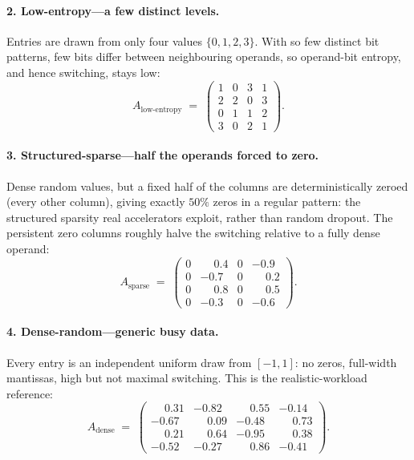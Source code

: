 \documentclass{article}
\theoremstyle{plain}
\theoremstyle{definition}
\theoremstyle{remark}
\begin{document}
\paragraph{2. Low-entropy---a few distinct levels.}
Entries are drawn from only four values $\{0,1,2,3\}$. With so few distinct
bit patterns, few bits differ between neighbouring operands, so operand-bit
entropy, and hence switching, stays low:
\begin{equation*}
	A_{\mathrm{low\text{-}entropy}} \;=\;
	\begin{pmatrix} 1 & 0 & 3 & 1 \\ 2 & 2 & 0 & 3 \\ 0 & 1 & 1 & 2 \\ 3 & 0 & 2 & 1 \end{pmatrix}.
\end{equation*}

\paragraph{3. Structured-sparse---half the operands forced to zero.}
Dense random values, but a fixed half of the columns are deterministically
zeroed (every other column), giving exactly $50\%$ zeros in a regular
pattern: the structured sparsity real accelerators exploit, rather than
random dropout. The persistent zero columns roughly halve the switching
relative to a fully dense operand:
\begin{equation*}
	A_{\mathrm{sparse}} \;=\;
	\begin{pmatrix}
		0 & \phantom{-}0.4 & 0 & -0.9 \\
		0 & -0.7 & 0 & \phantom{-}0.2 \\
		0 & \phantom{-}0.8 & 0 & \phantom{-}0.5 \\
		0 & -0.3 & 0 & -0.6
	\end{pmatrix}.
\end{equation*}

\paragraph{4. Dense-random---generic busy data.}
Every entry is an independent uniform draw from $[-1,1]$: no zeros,
full-width mantissas, high but not maximal switching. This is the
realistic-workload reference:
\begin{equation*}
	A_{\mathrm{dense}} \;=\;
	\begin{pmatrix}
		\phantom{-}0.31 & -0.82 & \phantom{-}0.55 & -0.14 \\
		-0.67 & \phantom{-}0.09 & -0.48 & \phantom{-}0.73 \\
		\phantom{-}0.21 & \phantom{-}0.64 & -0.95 & \phantom{-}0.38 \\
		-0.52 & -0.27 & \phantom{-}0.86 & -0.41
	\end{pmatrix}.
\end{equation*}
\end{document}
